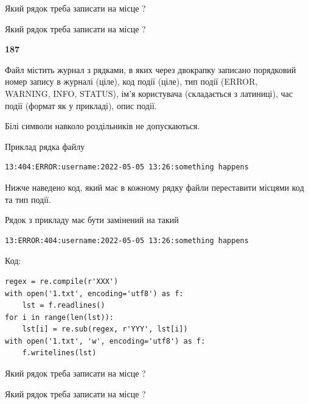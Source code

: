 Який рядок треба записати на місце  ?\par
\vspace{5mm}


Який рядок треба записати на місце  ?\par


\newpage

{\begin {center}\textbf{ 187}\end {center}}\par
Файл  містить журнал з рядками, в яких через двокрапку записано поряд\-ко\-вий номер запису в журналі (ціле), код події (ціле), тип події (ERROR,\\ WARNING, INFO, STATUS), ім'я користувача (складається з латиниці), час події (фор\-мат як у прикладі), опис події.

Білі символи навколо роздільників не допускаються.

Приклад рядка файлу



\begin{verbatim}
13:404:ERROR:username:2022-05-05 13:26:something happens
\end{verbatim}


Нижче наведено код, який має в кожному рядку файли переставити місцями код та тип події.

Рядок з прикладу має бути замінений на такий



\begin{verbatim}
13:ERROR:404:username:2022-05-05 13:26:something happens
\end{verbatim}




Код:



\begin{verbatim}
regex = re.compile(r'XXX')
with open('1.txt', encoding='utf8') as f:
    lst = f.readlines()
for i in range(len(lst)):
    lst[i] = re.sub(regex, r'YYY', lst[i])
with open('1.txt', 'w', encoding='utf8') as f:
    f.writelines(lst)
\end{verbatim}







Який рядок треба записати на місце  ?\par
\vspace{5mm}


Який рядок треба записати на місце  ?\par


